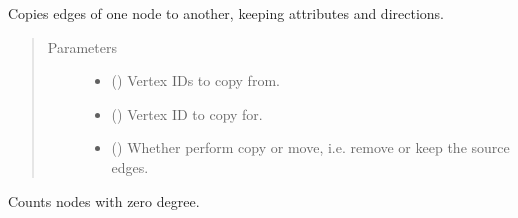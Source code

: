 \documentclass[letterpaper,10pt,english]{sphinxmanual}
\begin{document}
\begin{fulllineitems}
\begin{fulllineitems}
\begin{quote}
\begin{description}
\end{description}\end{quote}

\end{fulllineitems}


\begin{fulllineitems}
\label{\detokenize{main:pypath.main.PyPath.copy_edges}}
Copies edges of one node to another,
keeping attributes and directions.
\begin{quote}\begin{description}
\item[{Parameters}] \leavevmode\begin{itemize}
\item {} 
 () \textendash{} Vertex IDs to copy from.

\item {} 
 () \textendash{} Vertex ID to copy for.

\item {} 
 () \textendash{} Whether perform copy or move, i.e. remove or keep
the source edges.

\end{itemize}

\end{description}\end{quote}

\end{fulllineitems}


\begin{fulllineitems}
\label{\detokenize{main:pypath.main.PyPath.count_sol}}
Counts nodes with zero degree.

\end{fulllineitems}



\end{fulllineitems}
\end{document}
